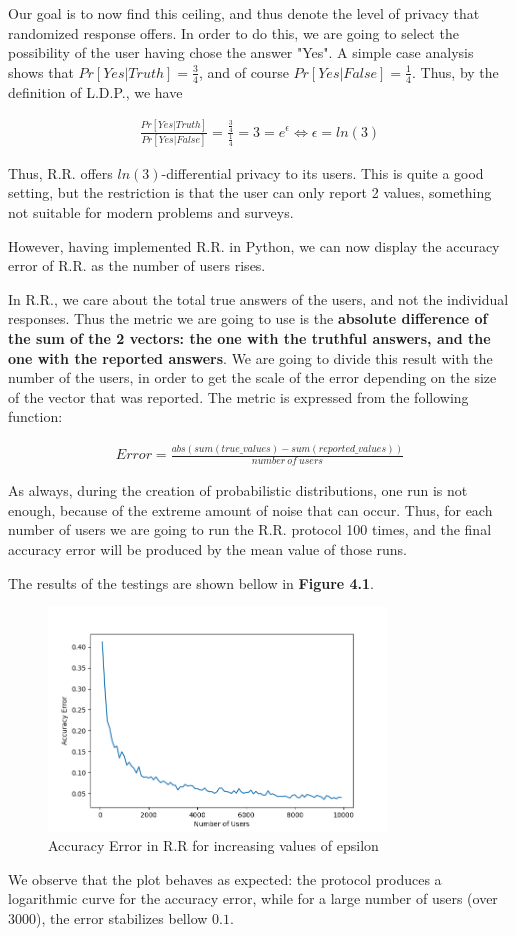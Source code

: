 Our goal is to now find this ceiling, and thus denote the level of privacy that randomized response offers. In order to do this, we are going to select the possibility of the user having chose the answer "Yes". A simple case analysis shows that $Pr[Yes | Truth] = \frac{3}{4}$, and of course $Pr[Yes | False] = \frac{1}{4}$. Thus, by the definition of L.D.P., we have 

\begin{align*}
    \frac{Pr[Yes | Truth]}{Pr[Yes | False]} = \frac{\frac{3}{4}}{\frac{1}{4}} = 3 = e^\epsilon \Longleftrightarrow \epsilon = ln(3)
\end{align*}

Thus, R.R. offers  $ln(3)$-differential privacy to its users. This is quite a good setting, but the restriction is that the user can only report 2 values, something not suitable for modern problems and surveys. 

However, having implemented R.R. in Python, we can now display the accuracy error of R.R. as the number of users rises.

In R.R., we care about the total true answers of the users, and not the individual responses. Thus the metric we are going to use is the \textbf{absolute difference of the sum of the 2 vectors: the one with the truthful answers, and the one with the reported answers}. We are going to divide this result with the number of the users, in order to get the scale of the error depending on the size of the vector that was reported. The metric is expressed from the following function:

\begin{align*}
    Error = \frac{abs(sum(true\_values) - sum(reported\_values)) }{number\ of \ users}
\end{align*}

As always, during the creation of probabilistic distributions, one run is not enough, because of the extreme amount of noise that can occur. Thus, for each number of users we are going to run the R.R. protocol 100 times, and the final accuracy error will be produced by the mean value of those runs.

The results of the testings are shown bellow in \textbf{Figure 4.1}.

\begin{figure}[!htb]\centering
    \includegraphics[width=0.8\textwidth]{images/rr_results.png}
    \caption{Accuracy Error in R.R for increasing values of epsilon}
\end{figure}


We observe that the plot behaves as expected: the protocol produces a logarithmic curve for the accuracy error, while for a large number of users (over 3000), the error stabilizes bellow $0.1$. 